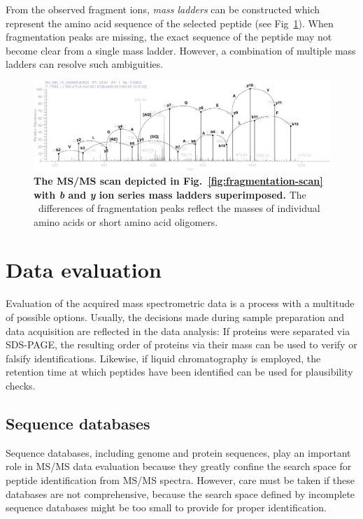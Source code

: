 From the observed fragment ions, {\em mass ladders} can be constructed which
represent the amino acid sequence of the selected peptide (see Fig~\ref{fig:fragmentation-scan-b-y}). 
When fragmentation peaks are missing, the exact sequence of the peptide may not
become clear from a single mass ladder.
However, a combination of multiple mass ladders can resolve such ambiguities.

\begin{figure}[h]
\includegraphics[width=\textwidth]{figures/ms2-scan-b-y-1.jpg}
\caption{
{\bf The MS/MS scan depicted in Fig.~\ref{fig:fragmentation-scan} with {\em b} and 
{\em y} ion series mass ladders superimposed.} 
The \mz~differences of fragmentation peaks reflect the masses of individual amino
acids or short amino acid oligomers.
}
\label{fig:fragmentation-scan-b-y}
\end{figure}


\section{Data evaluation}

Evaluation of the acquired mass spectrometric data is a process with a multitude
of possible options.
Usually, the decisions made during sample preparation and data acquisition are
reflected in the data analysis: If proteins were separated via SDS-PAGE, the
resulting order of proteins via their mass can be used to verify or falsify 
identifications.
Likewise, if liquid chromatography is employed, the retention time at which
peptides have been identified can be used for plausibility checks.

\subsection{Sequence databases}

Sequence databases, including genome and protein sequences, play an important
role in MS/MS data evaluation because they greatly confine the search space
for peptide identification from MS/MS spectra.
However, care must be taken if these databases are not comprehensive, because
the search space defined by incomplete sequence databases might be too small
to provide for proper identification.

